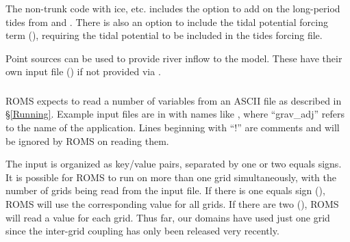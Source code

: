 The non-trunk code with ice, etc. includes the  option to
add on the long-period tides from
\citet{Foreman_96a} and \citet{Foreman_96b}.
There is also an option to include the tidal potential
forcing term (), requiring the tidal potential to
be included in the tides forcing file.

\smallskip
{}

Point sources can be used to provide river inflow to the model.
These have their own input file () if not provided via
.

\subsubsection{}
\label{ASCII_in}
ROMS expects to read a number of variables from an ASCII file as described
in \S\ref{Running}.
Example input files are in  with names like
, where ``grav\_adj'' refers to the name of
the application. Lines beginning with ``!'' are comments and will be
ignored by ROMS on reading them.

The input is organized as key/value pairs, separated by one or two
equals signs. It is possible for ROMS to run on more than one grid
simultaneously, with the number of grids being read from the input
file. If there is one equals sign (\code{=}), ROMS will use the
corresponding value for all grids. If there are two (\code{==}), ROMS
will read a value for each grid. Thus far, our domains have used just
one grid since the inter-grid coupling has only been released very
recently.

